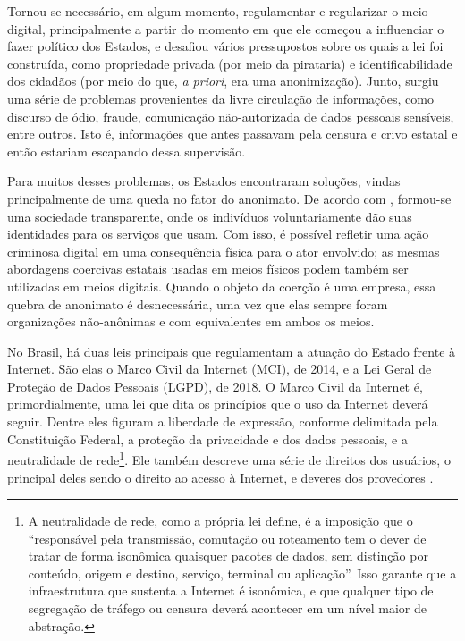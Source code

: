 Tornou-se necessário, em algum momento, regulamentar e regularizar o meio digital, principalmente a partir do momento em que ele começou a influenciar o fazer político dos Estados, e desafiou vários pressupostos sobre os quais a lei foi construída, como propriedade privada (por meio da pirataria) e identificabilidade dos cidadãos (por meio do que, \textit{a priori}, era uma anonimização).
Junto, surgiu uma série de problemas provenientes da livre circulação de informações, como discurso de ódio, fraude, comunicação não-autorizada de dados pessoais sensíveis, entre outros.
Isto é, informações que antes passavam pela censura e crivo estatal e então estariam escapando dessa supervisão.

Para muitos desses problemas, os Estados encontraram soluções, vindas principalmente de uma queda no fator do anonimato.
De acordo com \textcite{han_infocracia_2022}, formou-se uma sociedade transparente, onde os indivíduos voluntariamente dão suas identidades para os serviços que usam.
Com isso, é possível refletir uma ação criminosa digital em uma consequência física para o ator envolvido;  as mesmas abordagens coercivas estatais usadas em meios físicos podem também ser utilizadas em meios digitais.
Quando o objeto da coerção é uma empresa, essa quebra de anonimato é desnecessária, uma vez que elas sempre foram organizações não-anônimas e com equivalentes em ambos os meios.

No Brasil, há duas leis principais que regulamentam a atuação do Estado frente à Internet.
São elas o Marco Civil da Internet (MCI), de 2014, e a Lei Geral de Proteção de Dados Pessoais (LGPD), de 2018.
O Marco Civil da Internet é, primordialmente, uma lei que dita os princípios que o uso da Internet deverá seguir.
Dentre eles figuram a liberdade de expressão, conforme delimitada pela Constituição Federal, a proteção da privacidade e dos dados pessoais, e a neutralidade de rede\footnote{A neutralidade de rede, como a própria lei define, é a imposição que o ``responsável pela transmissão, comutação ou roteamento tem o dever de tratar de forma isonômica quaisquer pacotes de dados, sem distinção por conteúdo, origem e destino, serviço, terminal ou aplicação''. Isso garante que a infraestrutura que sustenta a Internet é isonômica, e que qualquer tipo de segregação de tráfego ou censura deverá acontecer em um nível maior de abstração.}.
Ele também descreve uma série de direitos dos usuários, o principal deles sendo o direito ao acesso à Internet, e deveres dos provedores \cite{brasil_lei_2014}.

